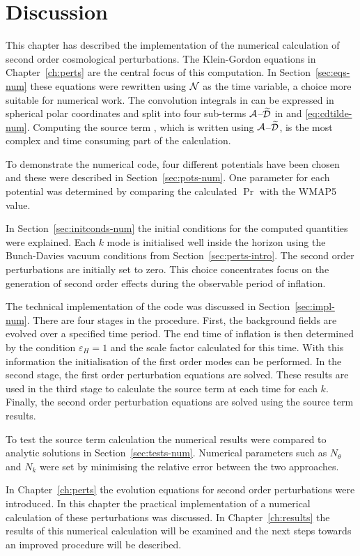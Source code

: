 \section{Discussion}
\label{sec:disc-numerical}
This chapter has described the implementation of the numerical calculation of second
order cosmological perturbations.
The Klein-Gordon equations in Chapter~\ref{ch:perts} are the central focus of this
computation. In Section~\ref{sec:eqs-num} these equations were rewritten using $\mathcal{N}$
as the time variable, a choice more suitable for numerical work. The convolution
integrals in  can be expressed in spherical polar
coordinates and split into four sub-terms $\mathcal{A}$--$\widetilde{\mathcal{D}}$ in  and
\eqref{eq:cdtilde-num}. Computing the source term
, which is written using $\mathcal{A}$--$\widetilde{\mathcal{D}}$, is the most complex
and
time consuming part of the calculation.

To demonstrate the numerical code, four different potentials have been chosen and
these were described in Section~\ref{sec:pots-num}. One parameter for each
potential was determined by comparing the calculated $\Pr$ with the WMAP5 value.

In Section~\ref{sec:initconds-num} the initial conditions for the computed
quantities were explained. Each $k$ mode is initialised well inside the horizon
using the Bunch-Davies vacuum conditions from Section~\ref{sec:perts-intro}. The
second order perturbations are initially set to zero. This choice
concentrates focus
on the generation of second order effects during the observable period of
inflation.


The technical implementation of the code was discussed in
Section~\ref{sec:impl-num}. There are four stages in the procedure. First, the
background fields are evolved over a specified time period. The end time of
inflation is then determined by the condition $\varepsilon_H=1$ and the scale factor
calculated for this time. With this
information the initialisation of the first order modes can be performed. In the
second stage, the first order perturbation equations are solved. These results are
used in the third stage to calculate the source term  at each
time for each $k$. Finally, the second order perturbation equations are solved using
the source term results.

To test the source term calculation the numerical results were compared to 
analytic solutions in Section~\ref{sec:tests-num}. Numerical parameters such as
$N_\theta$ and $N_k$ were set by minimising the relative error between the two
approaches.

In Chapter~\ref{ch:perts} the evolution equations for second order perturbations
were introduced. In this chapter the practical implementation of a numerical
calculation of these perturbations was discussed. In Chapter~\ref{ch:results} the
results of this numerical calculation will be examined and the next steps towards an
improved procedure will be described.